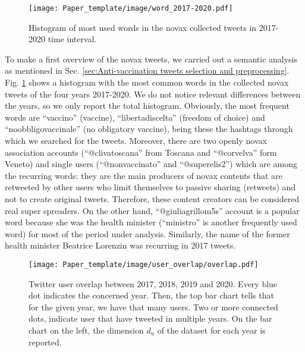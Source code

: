 \documentclass[prb,twocolumn,9pt]{revtex4-1}
\begin{document}
\begin{figure}[t]
   \begin{minipage}[l]{1.0\columnwidth}
   \centering
   \texttt{[image: Paper\_template/image/word\_2017-2020.pdf]}
   \caption{Histogram of most used words in the novax collected tweets in 2017-2020 time interval.}
   \label{fig:count_word}
   \end{minipage}
\end{figure}

To make a first overview of the novax tweets, we carried out a semantic analysis as mentioned in Sec. \ref{sec:Anti-vaccination tweets selection and preprocessing}. Fig. \ref{fig:count_word} shows a histogram with the most common words in the collected novax tweets of the four years 2017-2020. We do not notice relevant differences between the years, so we only report the total histogram. Obviously, the most frequent words are “vaccino” (vaccine), “libertadiscelta” (freedom of choice) and “noobbligovaccinale” (no obligatory vaccine), being these the hashtags through which we searched for the tweets.
Moreover, there are two openly novax association accounts (“@clivatoscana” from Toscana and “@corvelva” form Veneto) and single users (“@nonvaccinato” and “@superelis2”) which are among the recurring words: they are the main producers of novax contents that are retweeted by other users who limit themselves to passive sharing (retweets) and not to create original tweets. Therefore, these content creators can be considered real super spreaders. On the other hand, “@giuliagrillom5s” account is a popular word because she was the health minister (“ministro” is another frequently used word) for most of the period under analysis. Similarly, the name of the former health minister Beatrice Lorenzin was recurring in 2017 tweets.

\begin{figure}[t]
   \begin{minipage}[l]{1.0\columnwidth}
   \centering
   \texttt{[image: Paper\_template/image/user\_overlap/overlap.pdf]}
   \caption{Twitter user overlap between 2017, 2018, 2019 and 2020. Every blue dot indicates the concerned year. Then, the top bar chart tells that for the given year, we have that many users. Two or more connected dots, indicate user that have tweeted in multiple years. On the bar chart on the left, the dimension $d_u$ of the dataset for each year is reported.
   }
   \label{fig:overlap}
   \end{minipage}
\end{figure}
\end{document}

